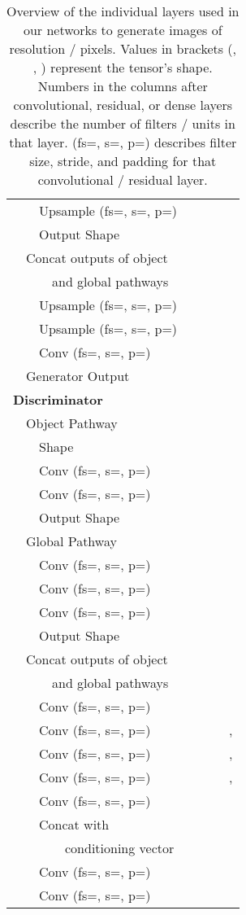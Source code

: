 \documentclass{article} \usepackage{iclr2019_conference,times}
\begin{document}
\begin{table}[h]
\begin{tabular}{l | c | c | c| c}
\ \ \ \ Upsample (fs=, s=, p=) &  &  &  &  \\
\ \ \ \ Output Shape &  &  &  &  \\
\ \ Concat outputs of object & \multirow{2}{*}{} & \multirow{2}{*}{} & \multirow{2}{*}{} & \multirow{2}{*}{} \\
\ \ \ \ \ \ and global pathways & & & & \\
\ \ \ \ Upsample (fs=, s=, p=) &  &  &  &  \\
\ \ \ \ Upsample (fs=, s=, p=) &  &  &  &  \\
\ \ \ \ Conv (fs=, s=, p=) &  &  &  &  \\
\ \ Generator Output &  &  &  &  \\
\textbf{Discriminator} & & & \\
\ \ Object Pathway & & & \\
\ \ \ \  Shape &  &  &  &  \\
\ \ \ \ Conv (fs=, s=, p=) &  &  &  &  \\
\ \ \ \ Conv (fs=, s=, p=) & & & &  \\
\ \ \ \ Output Shape &  &  &  &  \\
\ \ Global Pathway & & & \\
\ \ \ \ Conv (fs=, s=, p=) &  &  &  &  \\
\ \ \ \ Conv (fs=, s=, p=) &  &  &  &  \\
\ \ \ \ Conv (fs=, s=, p=) &  &  &  &  \\
\ \ \ \ Output Shape &  &  &  &  \\
\ \ Concat outputs of object & \multirow{2}{*}{} & \multirow{2}{*}{} & \multirow{2}{*}{} & \multirow{2}{*}{} \\
\ \ \ \ \ \ and global pathways & & & & \\
\ \ \ \ Conv (fs=, s=, p=) &  &  &  &  \\
\ \ \ \ Conv (fs=, s=, p=) &  &  &  & , \\
\ \ \ \ Conv (fs=, s=, p=) & & & & , \\
\ \ \ \ Conv (fs=, s=, p=) & & & & , \\
\ \ \ \ Conv (fs=, s=, p=) & & & &  \\
\ \ \ \ Concat with & \multirow{2}{*}{} & \multirow{2}{*}{} & \multirow{2}{*}{} & \multirow{2}{*}{} \\
\ \ \ \ \ \ \ \ conditioning vector & & & & \\
\ \ \ \ Conv (fs=, s=, p=) &  &  &  &  \\
\ \ \ \ Conv (fs=, s=, p=) &  &  &  &  \\
\bottomrule
\end{tabular}
\vspace{-1em}
\caption{Overview of the individual layers used in our networks to generate images of resolution  /  pixels. Values in brackets (, , ) represent the tensor's shape. Numbers in the columns after convolutional, residual, or dense layers describe the number of filters / units in that layer. (fs=, s=, p=) describes filter size, stride, and padding for that convolutional / residual layer.}
\label{app:tab:architecture:overview}
\end{table}
	
\end{document}
